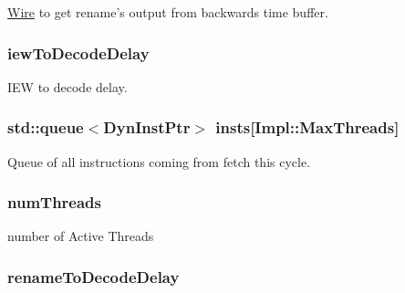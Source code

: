 \label{classDefaultDecode_ae99c54a9c8f1e218b86afcee348c54fc}
\hyperlink{classWire}{Wire} to get rename's output from backwards time buffer. \hypertarget{classDefaultDecode_ac7ece3c345b9ce038d4b7726da7c9b41}{
\subsubsection[{iewToDecodeDelay}]{ {\bf iewToDecodeDelay}}}
\label{classDefaultDecode_ac7ece3c345b9ce038d4b7726da7c9b41}
IEW to decode delay. \hypertarget{classDefaultDecode_a1b0ce60f9b6c662a2f3df87a3e8b50f8}{
\subsubsection[{insts}]{\setlength{\rightskip}{0pt plus 5cm}std::queue$<${\bf DynInstPtr}$>$ {\bf insts}\mbox{[}Impl::MaxThreads\mbox{]}}}
\label{classDefaultDecode_a1b0ce60f9b6c662a2f3df87a3e8b50f8}
Queue of all instructions coming from fetch this cycle. \hypertarget{classDefaultDecode_a88377f855dbf5adeeecb06b5bb821d35}{
\subsubsection[{numThreads}]{ {\bf numThreads}}}
\label{classDefaultDecode_a88377f855dbf5adeeecb06b5bb821d35}
number of Active Threads \hypertarget{classDefaultDecode_a3b9933c4d891d5618e6a103f0c231e8c}{
\subsubsection[{renameToDecodeDelay}]{ {\bf renameToDecodeDelay}}}
